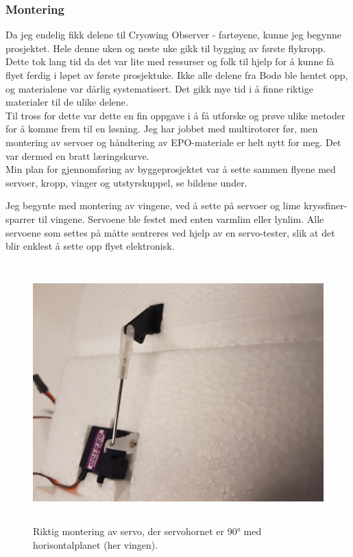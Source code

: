 \documentclass[12pt, a4paper]{report}
\begin{document}
\subsubsection{Montering}
Da jeg endelig fikk delene til Cryowing Observer - fartøyene, kunne jeg begynne prosjektet. Hele denne uken og neste uke gikk til bygging av første flykropp. Dette tok lang tid da det var lite med ressurser og folk til hjelp for å kunne få flyet ferdig i løpet av første prosjektuke. Ikke alle delene fra Bodø ble hentet opp, og materialene var dårlig systematisert. Det gikk mye tid i å finne riktige materialer til de ulike delene.\\
Til tross for dette var dette en fin oppgave i å få utforske og prøve ulike metoder for å komme frem til en løsning. Jeg har jobbet med multirotorer før, men montering av servoer og håndtering av EPO-materiale er helt nytt for meg. Det var dermed en bratt læringskurve. \\ Min plan for gjennomføring av byggeprosjektet var å sette sammen flyene med servoer, kropp, vinger og utstyrskuppel, se bildene under.

Jeg begynte med montering av vingene, ved å sette på servoer og lime kryssfiner-sparrer til vingene. Servoene ble festet med enten varmlim eller lynlim. Alle servoene som settes på måtte sentreres ved hjelp av en servo-tester, slik at det blir enklest å sette opp flyet elektronisk. 

\begin{figure}[ht]
	\centering
	\includegraphics[height = 10cm, width = .6\textwidth]{bilder/servomontering.jpg}
	\caption{Riktig montering av servo, der servohornet er \ang{90} med horisontalplanet (her vingen).}
\end{figure}
\end{document}

